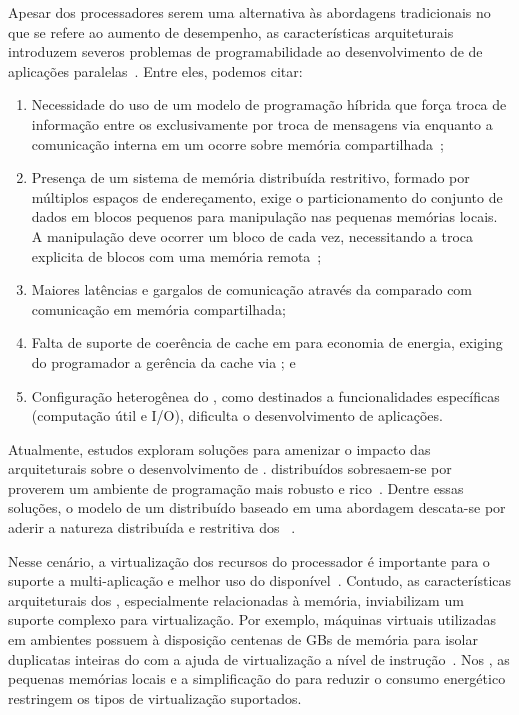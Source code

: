 Apesar dos processadores \lw serem uma alternativa às abordagens tradicionais no que se refere ao aumento de desempenho, as características arquiteturais introduzem severos problemas de programabilidade ao desenvolvimento de \software de aplicações paralelas~\cite{Castro-PARCO:2016}. Entre eles, podemos citar:

\begin{enumerate}[label= (\roman*)]
    \item Necessidade do uso de um modelo de programação híbrida que força troca de informação entre os \clusters exclusivamente por troca de mensagens via \noc enquanto a comunicação interna em um \cluster ocorre sobre memória compartilhada~\cite{kelly2013};
    \item Presença de um sistema de memória distribuída restritivo, formado por múltiplos espaços de endereçamento, exige o particionamento do conjunto de dados em blocos pequenos para manipulação nas pequenas memórias locais. A manipulação deve ocorrer um bloco de cada vez, necessitando a troca explicita de blocos com uma memória remota~\cite{Castro-PARCO:2016};
    \item Maiores latências e gargalos de comunicação através da \noc comparado com comunicação em memória compartilhada;
    \item Falta de suporte de coerência de cache em \hardware para economia de energia, exiging do programador a gerência da cache via \software; e
    \item Configuração heterogênea do \hardware, como \clusters destinados a funcionalidades específicas (computação útil e I/O), dificulta o desenvolvimento de aplicações.
\end{enumerate}

Atualmente, estudos exploram soluções para amenizar o impacto das arquiteturais sobre o desenvolvimento de \software. \oss distribuídos sobresaem-se por proverem um ambiente de programação mais robusto e rico~\cite{asmussen_m3:_2016, kluge_operating_2014, penna:sbesc19}. Dentre essas soluções, o modelo de um \os distribuído baseado em uma abordagem \multikernel descata-se por aderir a natureza distribuída e restritiva dos \lws~\cite{penna2017-1,penna2017-2,penna2019}.

Nesse cenário, a virtualização dos recursos do processador é importante para o suporte a multi-aplicação e melhor uso do \hardware disponível~\cite{vanz2022virtualizaccao}. Contudo, as características arquiteturais dos \lws, especialmente relacionadas à memória, inviabilizam um suporte complexo para virtualização. Por exemplo, máquinas virtuais utilizadas em ambientes \cloud possuem à disposição centenas de GBs de memória para isolar duplicatas inteiras do \os com a ajuda de virtualização a nível de instrução~\cite{sharma2016containers}. Nos \lws, as pequenas memórias locais e a simplificação do \hardware para reduzir o consumo energético restringem os tipos de virtualização suportados.

